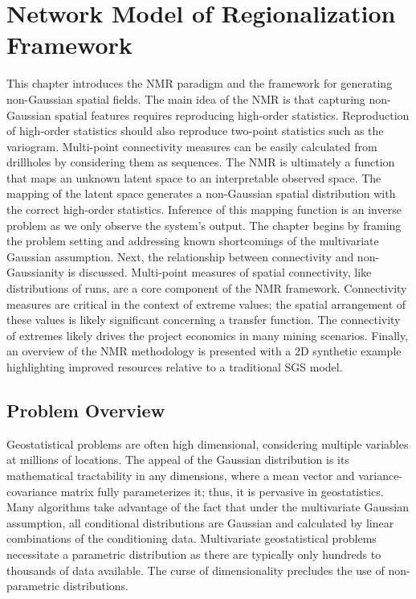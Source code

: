 
\chapter{Network Model of Regionalization Framework}
\label{ch:03framework}

This chapter introduces the \gls{NMR} paradigm and the framework for generating non-Gaussian spatial fields. The main idea of the \gls{NMR} is that capturing non-Gaussian spatial features requires reproducing high-order statistics. Reproduction of high-order statistics should also reproduce two-point statistics such as the variogram. Multi-point connectivity measures can be easily calculated from drillholes by considering them as sequences. The \gls{NMR} is ultimately a function that maps an unknown latent space to an interpretable observed space. The mapping of the latent space generates a non-Gaussian spatial distribution with the correct high-order statistics. Inference of this mapping function is an inverse problem as we only observe the system's output. The chapter begins by framing the problem setting and addressing known shortcomings of the multivariate Gaussian assumption. Next, the relationship between connectivity and non-Gaussianity is discussed. Multi-point measures of spatial connectivity, like distributions of runs, are a core component of the \gls{NMR} framework. Connectivity measures are critical in the context of extreme values; the spatial arrangement of these values is likely significant concerning a transfer function. The connectivity of extremes likely drives the project economics in many mining scenarios. Finally, an overview of the \gls{NMR} methodology is presented with a \gls{2D} synthetic example highlighting improved resources relative to a traditional \gls{SGS} model.


\FloatBarrier
\section{Problem Overview}
\label{sec:03overview}

Geostatistical problems are often high dimensional, considering multiple variables at millions of locations. The appeal of the Gaussian distribution is its mathematical tractability in  any dimensions, where a mean vector and variance-covariance matrix fully parameterizes it; thus, it is pervasive in geostatistics. Many algorithms take advantage of the fact that under the multivariate Gaussian assumption, all conditional distributions are Gaussian and calculated by linear combinations of the conditioning data. Multivariate geostatistical problems necessitate a parametric distribution as there are typically only hundreds to thousands of data available. The curse of dimensionality \citep{bellman1961adaptive} precludes the use of non-parametric distributions.

